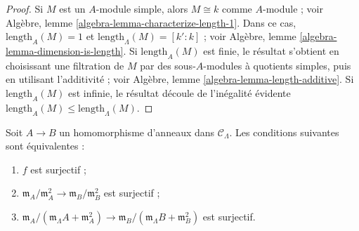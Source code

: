 \begin{proof}
Si $M$ est un $A$-module simple, alors $M \cong k$ comme $A$-module ; voir
Algèbre, lemme \ref{algebra-lemma-characterize-length-1}.
Dans ce cas, $\text{length}_A(M) = 1$ et
$\text{length}_\Lambda(M) = [k' : k]$ ; voir
Algèbre, lemme \ref{algebra-lemma-dimension-is-length}.
Si $\text{length}_A(M)$ est finie, le résultat s'obtient en choisissant une
filtration de $M$ par des sous-$A$-modules à quotients simples, puis en
utilisant l'additivité ; voir Algèbre, lemme
\ref{algebra-lemma-length-additive}. Si $\text{length}_A(M)$ est infinie, le
résultat découle de l'inégalité évidente
$\text{length}_A(M) \leq \text{length}_\Lambda(M)$.
\end{proof}

\begin{lemma}
\label{lemma-surjective}
Soit $A \to B$ un homomorphisme d'anneaux dans $\mathcal{C}_\Lambda$.
Les conditions suivantes sont équivalentes :
\begin{enumerate}
\item $f$ est surjectif ;
\item $\mathfrak m_A/\mathfrak m_A^2 \to \mathfrak m_B/\mathfrak m_B^2$
est surjectif ;
\item $\mathfrak m_A/(\mathfrak m_\Lambda A + \mathfrak m_A^2)
\to \mathfrak m_B/(\mathfrak m_\Lambda B + \mathfrak m_B^2)$ est surjectif.
\end{enumerate}
\end{lemma}

